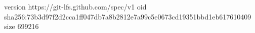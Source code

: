 version https://git-lfs.github.com/spec/v1
oid sha256:73b3d97f2d2cca1ff047db7a8b2812e7a99c5e0673cd19351bbd1eb617610409
size 699216
